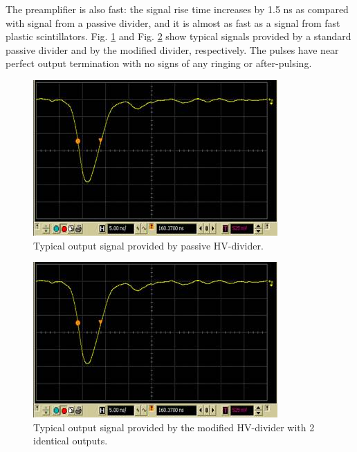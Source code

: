 The preamplifier is also fast: the signal rise time increases by 1.5 ns as compared with signal from a passive divider, and it is almost as fast as a signal from fast plastic scintillators. Fig. \ref{fig:POPOV_2} and Fig. \ref{fig:POPOV_3} show typical signals provided by a standard passive divider and by the modified divider, respectively. The pulses have near perfect output termination with no signs of any ringing or after-pulsing.

\begin{figure}[!ht]
    \centering
    \includegraphics[width=1.0\linewidth,trim={0.0cm 0.0cm 0.0cm 0.0cm},clip]{images/POPOV_2.jpg}
    \caption{Typical output signal provided by passive HV-divider.}
    \label{fig:POPOV_2}
\end{figure}

 \begin{figure}[!ht]
    \centering
    \includegraphics[width=1.0\linewidth,trim={0.0cm 0.0cm 0.0cm 0.0cm},clip]{images/POPOV_3.jpg}
    \caption{Typical output signal provided by the modified HV-divider with 2 identical outputs.}
    \label{fig:POPOV_3}
\end{figure}

